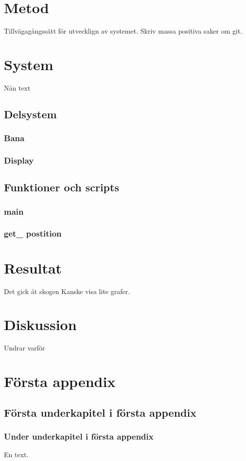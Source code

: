 \documentclass[10pt,oneside,swedish]{lips-no_customer}
\begin{document}
\section{Metod}
Tillvägagångssätt för utvecklign av systemet. Skriv massa positiva saker om git.
\section{System}
 Nån text
	\subsection{Delsystem}
		\subsubsection{Bana}
		\subsubsection{Display}
	\subsection{Funktioner och scripts}
		\subsubsection{main}
		\subsubsection{get\_ postition}

\section{Resultat}
Det gick åt skogen
Kanske visa lite grafer.

\section{Diskussion}
Undrar varför



\cleardoublepage
\appendix
\section{Första appendix}
\subsection{Första underkapitel i första appendix}
\lipsum[5]

\subsubsection{Under underkapitel i första appendix}
En text.
\end{document}
